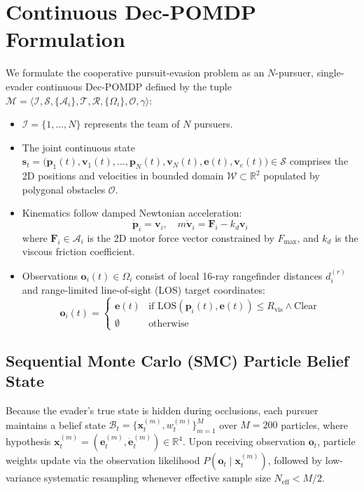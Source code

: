 \documentclass[conference]{IEEEtran}
\begin{document}
\section{Continuous Dec-POMDP Formulation}
We formulate the cooperative pursuit-evasion problem as an $N$-pursuer, single-evader continuous Dec-POMDP defined by the tuple $\mathcal{M} = \langle \mathcal{I}, \mathcal{S}, \{\mathcal{A}_i\}, \mathcal{T}, \mathcal{R}, \{\Omega_i\}, \mathcal{O}, \gamma \rangle$:
\begin{itemize}
    \item $\mathcal{I} = \{1, \dots, N\}$ represents the team of $N$ pursuers.
    \item The joint continuous state $\mathbf{s}_t = \big( \mathbf{p}_1(t), \mathbf{v}_1(t), \dots, \mathbf{p}_N(t), \mathbf{v}_N(t), \mathbf{e}(t), \mathbf{v}_e(t) \big) \in \mathcal{S}$ comprises the 2D positions and velocities in bounded domain $\mathcal{W} \subset \mathbb{R}^2$ populated by polygonal obstacles $\mathcal{O}$.
    \item Kinematics follow damped Newtonian acceleration:
    \begin{equation}
        \dot{\mathbf{p}}_i = \mathbf{v}_i, \quad m \dot{\mathbf{v}}_i = \mathbf{F}_i - k_d \mathbf{v}_i
    \end{equation}
    where $\mathbf{F}_i \in \mathcal{A}_i$ is the 2D motor force vector constrained by $F_{\max}$, and $k_d$ is the viscous friction coefficient.
    \item Observations $\mathbf{o}_i(t) \in \Omega_i$ consist of local 16-ray rangefinder distances $d_i^{(r)}$ and range-limited line-of-sight (LOS) target coordinates:
    \begin{equation}
        \mathbf{o}_i(t) = \begin{cases} \mathbf{e}(t) & \text{if } \text{LOS}(\mathbf{p}_i(t), \mathbf{e}(t)) \le R_{\text{vis}} \land \text{Clear} \\ \emptyset & \text{otherwise} \end{cases}
    \end{equation}
\end{itemize}

\subsection{Sequential Monte Carlo (SMC) Particle Belief State}
Because the evader's true state is hidden during occlusions, each pursuer maintains a belief state $\mathcal{B}_t = \{ \mathbf{x}_t^{(m)}, w_t^{(m)} \}_{m=1}^M$ over $M = 200$ particles, where hypothesis $\mathbf{x}_t^{(m)} = (\mathbf{e}_t^{(m)}, \dot{\mathbf{e}}_t^{(m)}) \in \mathbb{R}^4$.
Upon receiving observation $\mathbf{o}_t$, particle weights update via the observation likelihood $P(\mathbf{o}_t \mid \mathbf{x}_t^{(m)})$, followed by low-variance systematic resampling whenever effective sample size $N_{\text{eff}} < M/2$.
\end{document}
